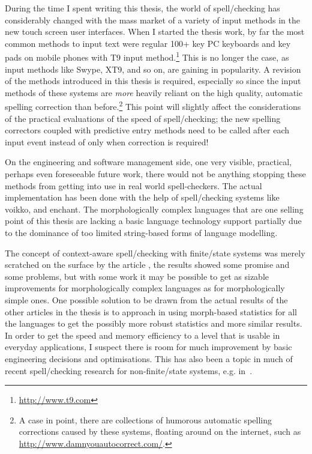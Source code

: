 \documentclass[officiallayout,final]{unihelcompling}
\begin{document}
During the time I spent writing this thesis, the world of spell\-/checking has
considerably changed with the mass market of a variety of input methods in the
new touch screen user interfaces. When I started the thesis work, by far the
most common methods to input text were regular 100+ key PC keyboards and key
pads on mobile phones with T9 input method.\footnote{\url{http://www.t9.com}}
This is no longer the case, as input methods like Swype, XT9, and so on, are
gaining in popularity. A revision of the methods introduced in this thesis is
required, especially so since the input methods of these systems are
\emph{more} heavily reliant on the high quality, automatic spelling correction
than before.\footnote{A case in point, there are collections of humorous
automatic spelling corrections caused by these systems, floating around on the
internet, such as \url{http://www.damnyouautocorrect.com/}.}  This point will
slightly affect the considerations of the practical evaluations of the speed of
spell\-/checking; the new spelling correctors coupled with predictive entry
methods need to be called after each input event instead of only when
correction is required!

On the engineering and software management side, one very visible, practical,
perhaps even foreseeable future work, there would not be anything stopping
these methods from getting into use in real world spell-checkers. The actual
implementation has been done with the help of spell\-/checking systems like
voikko, and enchant. The morphologically complex languages that are one selling
point of this thesis are lacking a basic language technology support partially
due to the dominance of too limited string-based forms of language modelling.

The concept of context-aware spell\-/checking with finite\-/state systems was
merely scratched on the surface by the article
, the results showed some promise and some
problems, but with some work it may be possible to get as sizable improvements
for morphologically complex languages as for morphologically simple ones. One
possible solution to be drawn from the actual results of the other articles in
the thesis is to approach in using morph-based statistics for all the languages
to get the possibly more robust statistics and more similar results. In order
to get the speed and memory efficiency to a level that is usable in everyday
applications, I suspect there is room for much improvement by basic engineering
decisions and optimisations. This has also been a topic in much of recent
spell\-/checking research for non-finite\-/state systems, e.g.
in~\citep{carlson2001scaling}.
\end{document}
